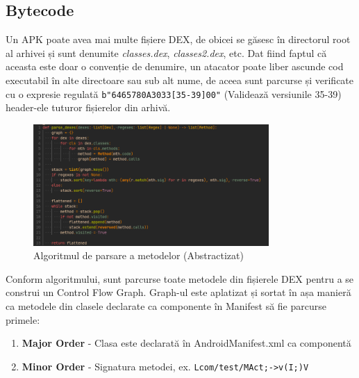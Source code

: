 \documentclass[12pt,a4paper]{report}
\begin{document}
\subsection{Bytecode}
Un APK poate avea mai multe fișiere DEX, de obicei se găsesc în directorul root al arhivei și sunt denumite \textit{classes.dex}, \textit{classes2.dex}, etc.
Dat fiind faptul că aceasta este doar o convenție de denumire, un atacator poate liber ascunde cod executabil în alte directoare sau sub alt nume,
de aceea sunt parcurse și verificate cu o expresie regulată \texttt{b"6465780A3033[35-39]00"} (Validează versiunile 35-39) header-ele tuturor fișierelor din arhivă.
\begin{figure}[H]
      \centering
      \includegraphics[width=0.8\textwidth]{visuals/method_extraction.png}
      \caption{Algoritmul de parsare a metodelor (Abstractizat)}
      \label{fig:bytecode_parsing}
\end{figure}

Conform algoritmului, sunt parcurse toate metodele din fișierele DEX pentru a se construi un Control Flow Graph.
Graph-ul este aplatizat și sortat în așa manieră ca metodele din clasele declarate ca componente în Manifest să fie parcurse primele:
\begin{enumerate}
      \item \textbf{Major Order} - Clasa este declarată în AndroidManifest.xml ca componentă
      \item \textbf{Minor Order} - Signatura metodei, ex. \texttt{Lcom/test/MAct;->v(I;)V}
\end{enumerate}
\end{document}

